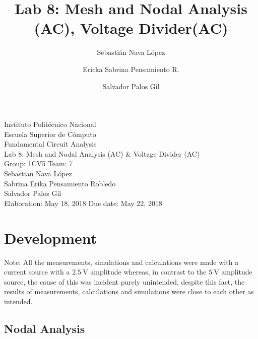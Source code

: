\documentclass[letterpaper]{article}
\title{Lab 8: Mesh and Nodal Analysis (AC), Voltage Divider(AC)}
\author{
    Sebastián Nava López\\
    \and
    Ericka Sabrina Pensamiento R.\\
    \and
    Salvador Palos Gil
}
\begin{document}
\begin{titlepage}
    \centering
    {\Huge Instituto Politécnico Nacional}\\[3ex]
    {\huge Escuela Superior de Cómputo}\\[8ex]
    {\huge Fundamental Circuit Analysis}\\[12ex]
    {\Large Lab 8: Mesh and Nodal Analysis (AC) \& Voltage Divider (AC)}\\[20ex]
    {\Large Group: 1CV5 Team: 7 \\[8ex]
    Sebastian Nava López\\[4ex]
    Sabrina Erika Pensamiento Robledo\\[4ex]
    Salvador Palos Gil\\[18ex]
    }
    \large{Elaboration: May 18, 2018 \hspace{8em} Due date: May 22, 2018}
\end{titlepage}
\tableofcontents
\newpage
\section{Development}
Note: All the measurements, simulations and calculations were made with a current source with a
$\SI{2.5}{\volt}$ amplitude whereas, in contrast to the $\SI{5}{\volt}$ amplitude source, the cause
of this was incident purely unintended, despite this fact, the results of measurements, calculations and
simulations were close to each other as intended.
\subsection{Nodal Analysis}
\end{document}
